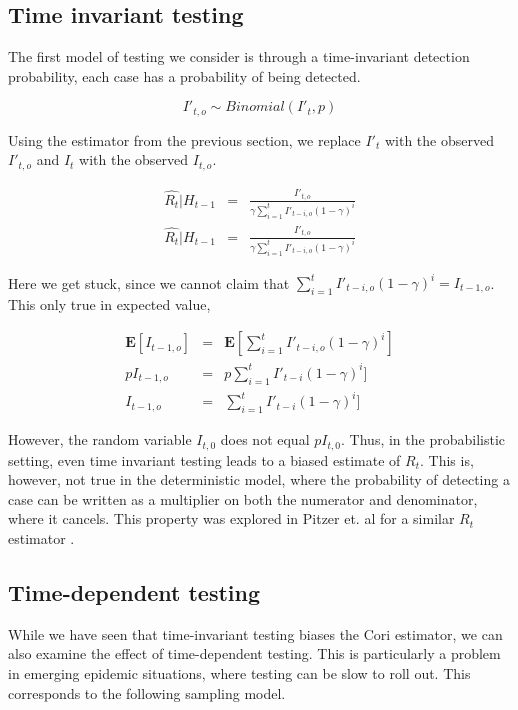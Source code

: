 \documentclass{umassthesis}          %
\begin{document}
\subsection{Time invariant testing}

The first model of testing we consider is through a time-invariant detection probability, each case has a probability of being detected. 

\begin{equation}
I'_{t,o} \sim Binomial(I'_t,p)	
\end{equation}

Using the estimator from the previous section, we replace $I'_t$ with the observed $I'_{t,o}$ and $I_t$ with the observed $I_{t,o}$.

\begin{eqnarray}
\hat{R_t} | H_{t-1} &=& \frac{I'_{t,o}}{\gamma \sum_{i=1}^t I'_{t-i,o} (1-\gamma)^i}\\
\hat{R_t} | H_{t-1} &=& \frac{I'_{t,o}}{\gamma \sum_{i=1}^t I'_{t-i,o} (1-\gamma)^i}
\end{eqnarray}

Here we get stuck, since we cannot claim that $\sum_{i=1}^t I'_{t-i,o} (1-\gamma)^i = I_{t-1,o}$. This only true in expected value, 

\begin{eqnarray}
\mathbf{E}[I_{t-1,o}] &=& \mathbf{E}[\sum_{i=1}^t I'_{t-i,o} (1-\gamma)^i]\\
pI_{t-1,o} &=& p\sum_{i=1}^t I'_{t-i} (1-\gamma)^i]\\
I_{t-1,o} &=& \sum_{i=1}^t I'_{t-i} (1-\gamma)^i]
\end{eqnarray}

However, the random variable $I_{t,0}$ does not equal $p I_{t,0}$. Thus, in the probabilistic setting, even time invariant testing leads to a biased estimate of $R_t$. This is, however, not true in the deterministic model, where the probability of detecting a case can be written as a multiplier on both the numerator and denominator, where it cancels. This property was explored in Pitzer et. al for a similar $R_t$ estimator \cite{pitzer2020impact}. 

\subsection{Time-dependent testing}
While we have seen that time-invariant testing biases the Cori estimator, we can also examine the effect of time-dependent testing. This is particularly a problem in emerging epidemic situations, where testing can be slow to roll out. This corresponds to the following sampling model.
\end{document}
